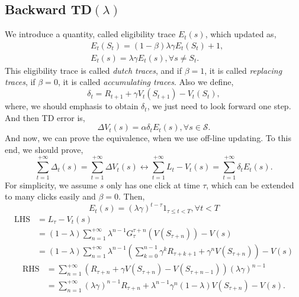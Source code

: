 \documentclass[11pt,a4paper]{article}
\def\S{{\mathcal S}}
\begin{document}
\subsection{Backward TD$(\lambda)$}
We introduce a quantity, called eligibility trace $E_t(s)$, which updated as,
\begin{eqnarray}
& E_t(S_t) = (1-\beta)\lambda\gamma E_t(S_t) + 1, \\ 
& E_t(s) = \lambda \gamma E_t(s), \forall s \neq S_t.
\end{eqnarray}
This eligibility trace is called \emph{dutch traces}, and if $\beta = 1$, it is called \emph{replacing traces}, if $\beta = 0$, it is called \emph{accumulating traces}. Also we define,
\begin{equation}
\delta_t = R_{t+1} + \gamma V_{t}(S_{t+1}) - V_t(S_t),
\end{equation}
where, we should emphasis to obtain $\delta_t$, we just need to look forward one step. And then TD error is,
\begin{equation}
\Delta V_t(s) = \alpha \delta_t E_t(s), \forall s\in \S.
\end{equation}
And now, we can prove the equivalence, when we use off-line updating. To this end, we should prove,
\begin{equation}
\sum_{t=1}^{+\infty} \Delta_t(s) = \sum_{t=1}^{+\infty}\Delta V_t(s) \leftrightarrow \sum_{t=1}^{+\infty}L_t-V_t(s) = \sum_{t=1}^{+\infty}\delta_t E_t(s).
\end{equation}
For simplicity, we assume $s$ only has one click at time $\tau$, which can be extended to many clicks easily and $\beta = 0$. Then,
\begin{equation}
E_t(s) = (\lambda\gamma)^{t-\tau}1_{\tau\le t<T}, \forall t<T
\end{equation}
\begin{align}
\mathrm{LHS} & = L_{\tau} - V_t(s) \\ 
& = (1-\lambda)\sum_{n=1}^{+\infty}\lambda^{n-1}G_{\tau}^{\tau+n}(V(S_{\tau +n})) - V(s) \\ 
& = (1-\lambda)\sum_{n=1}^{+\infty}\lambda^{n-1}\left(\sum_{k=0}^{n-1}\gamma^k R_{\tau+k+1} + \gamma^n V(S_{\tau +n})\right) - V(s)
\end{align}
\begin{align}
\mathrm{RHS} & = \sum_{n=1}^{+\infty}(R_{\tau+n} + \gamma V(S_{\tau +n})-V(S_{\tau+n-1}))(\lambda\gamma)^{n-1} \\ 
& = \sum_{n=1}^{+\infty}(\lambda\gamma)^{n-1}R_{\tau+n} + \lambda^{n-1}\gamma^n(1-\lambda) V(S_{\tau+n}) - V(s).
\end{align}
\end{document}
